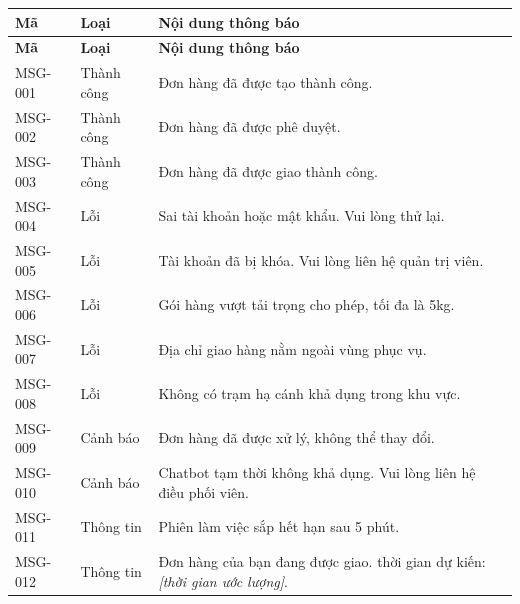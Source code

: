 \begin{longtable}{|l|l|p{9cm}|}
  \hline
  \textbf{Mã} & \textbf{Loại} & \textbf{Nội dung thông báo} \\
  \hline
  \endfirsthead
  \hline
  \textbf{Mã} & \textbf{Loại} & \textbf{Nội dung thông báo} \\
  \hline
  \endhead
  \hline
  \endfoot
  \hline
  \endlastfoot
  MSG-001 & Thành công  & Đơn hàng đã được tạo thành công. \\ \hline
  MSG-002 & Thành công  & Đơn hàng đã được phê duyệt. \\ \hline
  MSG-003 & Thành công  & Đơn hàng đã được giao thành công. \\ \hline
  MSG-004 & Lỗi         & Sai tài khoản hoặc mật khẩu. Vui lòng thử lại. \\ \hline
  MSG-005 & Lỗi         & Tài khoản đã bị khóa. Vui lòng liên hệ quản trị viên. \\ \hline
  MSG-006 & Lỗi         & Gói hàng vượt tải trọng cho phép, tối đa là 5kg. \\ \hline
  MSG-007 & Lỗi         & Địa chỉ giao hàng nằm ngoài vùng phục vụ. \\ \hline
  MSG-008 & Lỗi         & Không có trạm hạ cánh khả dụng trong khu vực. \\ \hline
  MSG-009 & Cảnh báo    & Đơn hàng đã được xử lý, không thể thay đổi. \\ \hline
  MSG-010 & Cảnh báo    & Chatbot tạm thời không khả dụng. Vui lòng liên hệ điều phối viên. \\ \hline
  MSG-011 & Thông tin   & Phiên làm việc sắp hết hạn sau 5 phút. \\ \hline
  MSG-012 & Thông tin   & Đơn hàng của bạn đang được giao. thời gian dự kiến: \textit{[thời gian ước lượng]}. \\
\end{longtable}
